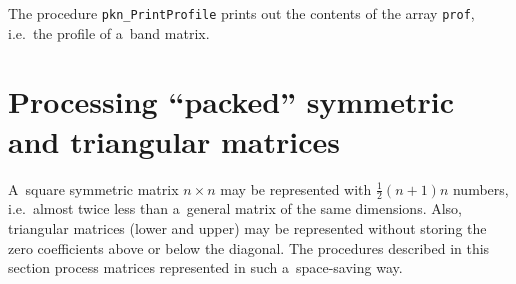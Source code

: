 \vspace{\bigskipamount}
The procedure \texttt{pkn\_PrintProfile} prints out the contents of the array
\texttt{prof}, i.e.\ the profile of a~band matrix.


\newpage
\section[Processing ``packed'' symmetric and triangular matrices]%
  {\label{sect:packed:sym:array}Processing ``packed'' symmetric \\
   and triangular matrices}

A~square symmetric matrix $n\times n$ may be represented with
$\frac{1}{2}(n+1)n$ numbers, i.e.\ almost twice less than a~general matrix
of the same dimensions. Also, triangular matrices (lower and upper)
may be represented without storing the zero coefficients above
or below the diagonal. The procedures described in this section process
matrices represented in such a~space-saving way.
